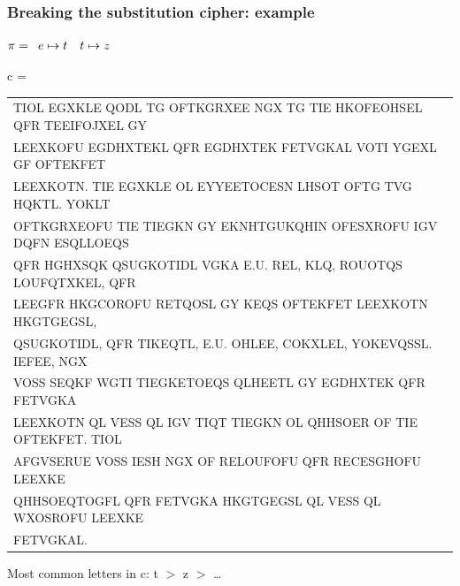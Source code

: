 \documentclass[aspectratio=169, lualatex, 10pt,dvipsnames,svgnames]{beamer} %
\def\enbleu#1{\textcolor{bleu}{#1}}
\def\enrouge#1{\textcolor{rouge}{#1}}
\begin{document}
\begin{frame}
  \frametitle{Breaking the substitution cipher: example}

    \enrouge{
    \tiny{$\pi=
      \begin{array}[t]{l}
       e\mapsto t\quad t\mapsto z\
      \end{array}
      $}}
  \vspace{0.25cm}
  
  \color{vert}
  \tiny{c =
    \begin{tabular}[t]{l}
      \enbleu{T}IOL EGXKL\enbleu{E} QODL \enbleu{T}G OF\enbleu{T}KGRXE\enbleu{E} NGX \enbleu{T}G \enbleu{T}I\enbleu{E} HKOFEOHS\enbleu{E}L QFR \enbleu{T}\enbleu{E}EIFOJX\enbleu{E}L GY \\
      L\enbleu{E}EXKOFU EGDHX\enbleu{T}\enbleu{E}KL QFR EGDHX\enbleu{T}\enbleu{E}K F\enbleu{E}\enbleu{T}VGKAL VO\enbleu{T}I YGEXL GF OF\enbleu{T}\enbleu{E}KF\enbleu{E}\enbleu{T} \\
      L\enbleu{E}EXKO\enbleu{T}N. \enbleu{T}I\enbleu{E} EGXKL\enbleu{E} OL \enbleu{E}YY\enbleu{E}E\enbleu{T}OC\enbleu{E}SN LHSO\enbleu{T} OF\enbleu{T}G \enbleu{T}VG HQK\enbleu{T}L. YOKL\enbleu{T} \\
      OF\enbleu{T}KGRXEOFU \enbleu{T}I\enbleu{E} \enbleu{T}I\enbleu{E}GKN GY EKNH\enbleu{T}GUKQHIN OFESXROFU IGV DQFN ESQLLOEQS \\
      QFR HGHXSQK QSUGKO\enbleu{T}IDL VGKA \enbleu{E}.U. R\enbleu{E}L, KLQ, ROUO\enbleu{T}QS LOUFQ\enbleu{T}XK\enbleu{E}L, QFR \\
      L\enbleu{E}EGFR HKGCOROFU R\enbleu{E}\enbleu{T}QOSL GY K\enbleu{E}QS OF\enbleu{T}\enbleu{E}KF\enbleu{E}\enbleu{T} L\enbleu{E}EXKO\enbleu{T}N HKG\enbleu{T}GEGSL, \\
      QSUGKO\enbleu{T}IDL, QFR \enbleu{T}IK\enbleu{E}Q\enbleu{T}L, \enbleu{E}.U. OHL\enbleu{E}E, COKXL\enbleu{E}L, YOK\enbleu{E}VQSSL. I\enbleu{E}FE\enbleu{E}, NGX \\
      VOSS S\enbleu{E}QKF WG\enbleu{T}I \enbleu{T}I\enbleu{E}GK\enbleu{E}\enbleu{T}OEQS QLH\enbleu{E}E\enbleu{T}L GY EGDHX\enbleu{T}\enbleu{E}K QFR F\enbleu{E}\enbleu{T}VGKA \\
      L\enbleu{E}EXKO\enbleu{T}N QL V\enbleu{E}SS QL IGV \enbleu{T}IQ\enbleu{T} \enbleu{T}I\enbleu{E}GKN OL QHHSO\enbleu{E}R OF \enbleu{T}I\enbleu{E} OF\enbleu{T}\enbleu{E}KF\enbleu{E}\enbleu{T}. \enbleu{T}IOL \\
      AFGVS\enbleu{E}RU\enbleu{E} VOSS I\enbleu{E}SH NGX OF R\enbleu{E}LOUFOFU QFR R\enbleu{E}C\enbleu{E}SGHOFU L\enbleu{E}EXK\enbleu{E} \\
      QHHSOEQ\enbleu{T}OGFL QFR F\enbleu{E}\enbleu{T}VGKA HKG\enbleu{T}GEGSL QL V\enbleu{E}SS QL WXOSROFU L\enbleu{E}EXK\enbleu{E} \\
      F\enbleu{E}\enbleu{T}VGKAL.
    \end{tabular}
  }
  \vspace{0.5cm}

  \normalsize
  \color{black}Most common letters in c: t $>$ z $>$ \dots
  
  \color{black}
\end{frame}
\end{document}
